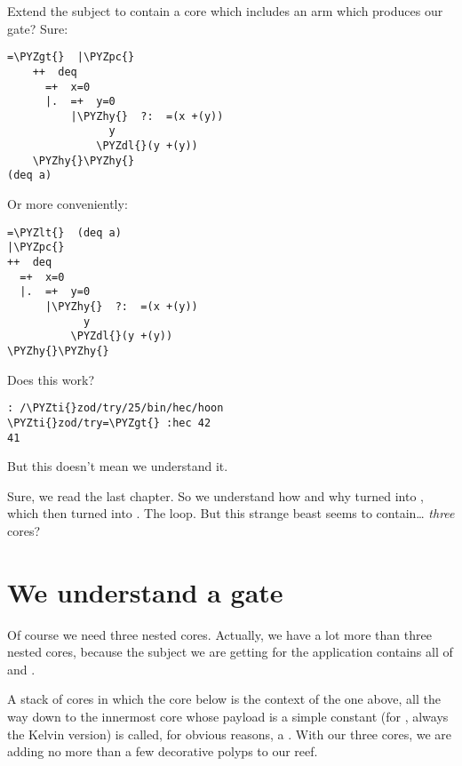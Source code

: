 Extend the subject to contain a core which includes an arm which
produces our gate?  Sure:

\begin{framed_shaded}
\begin{Verbatim}[fontsize=\relsize{-2.5},fontseries=b,commandchars=\\\{\}]
=\PYZgt{}  |\PYZpc{}
    ++  deq
      =+  x=0
      |.  =+  y=0
          |\PYZhy{}  ?:  =(x +(y))
                y
              \PYZdl{}(y +(y))
    \PYZhy{}\PYZhy{}
(deq a)
\end{Verbatim}
\end{framed_shaded}

Or more conveniently:

\begin{framed_shaded}
\begin{Verbatim}[fontsize=\relsize{-2.5},fontseries=b,commandchars=\\\{\}]
=\PYZlt{}  (deq a)
|\PYZpc{}
++  deq
  =+  x=0
  |.  =+  y=0
      |\PYZhy{}  ?:  =(x +(y))
            y
          \PYZdl{}(y +(y))
\PYZhy{}\PYZhy{}
\end{Verbatim}
\end{framed_shaded}

Does this work?

\begin{framed_shaded}
\begin{Verbatim}[fontsize=\relsize{-2.5},fontseries=b,commandchars=\\\{\}]
: /\PYZti{}zod/try/25/bin/hec/hoon
\PYZti{}zod/try=\PYZgt{} :hec 42
41
\end{Verbatim}
\end{framed_shaded}
But this doesn't mean we understand it.  

Sure, we read the last chapter.  So we understand how and why
\kode{\textbar{}\%} turned into , which then turned into \kode{\textbar{}-}.  The loop.
But this strange beast seems to contain\ldots{} \emph{three} cores? 

\section{We understand a gate}

Of course we need three nested cores.  Actually, we have a lot
more than three nested cores, because the subject we are getting
for the application contains all of  and .

A stack of cores in which the core below is the context of the
one above, all the way down to the innermost core whose payload
is a simple constant (for , always the Kelvin version)
is called, for obvious reasons, a .  With our three cores,
we are adding no more than a few decorative polyps to our reef.

